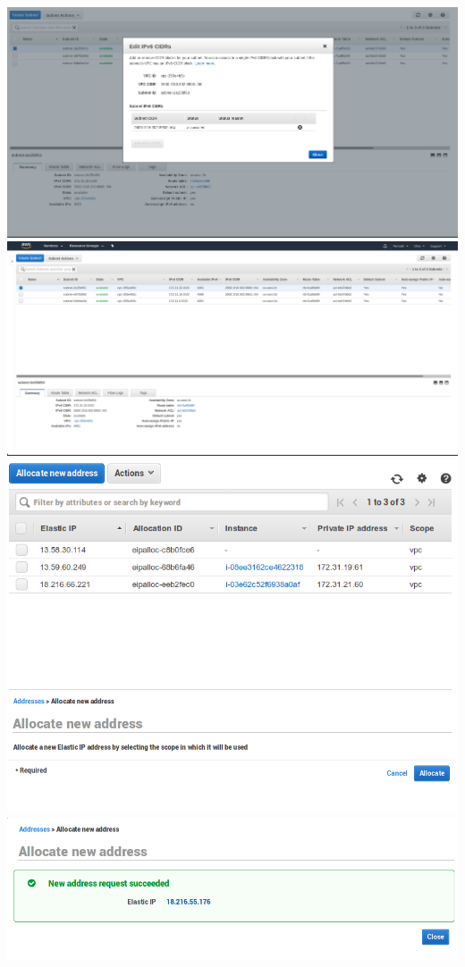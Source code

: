 \documentclass[9pt]{article}
\begin{document}
\includegraphics[width=\textwidth]{ipv6_cidr}
\includegraphics[width=\textwidth]{subnets}
\includegraphics[width=\textwidth]{elastic_ip}
\includegraphics[width=\textwidth]{elastic_ip_allocate}
\includegraphics[width=\textwidth]{elastic_ip_success}
\end{document}
